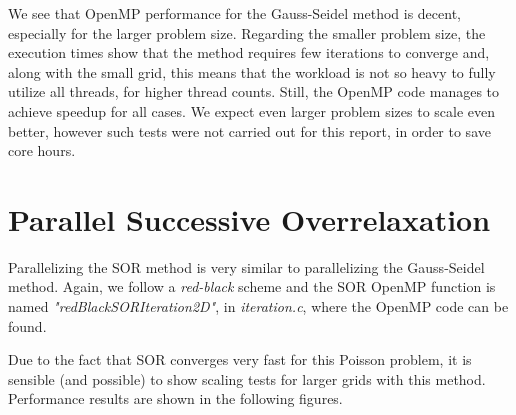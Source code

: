 \documentclass[11pt]{report}
\begin{document}
\newpage

We see that OpenMP performance for the Gauss-Seidel method is decent, especially for the larger problem size. Regarding the smaller problem size, the execution times show that the method requires few iterations to converge and, along with the small grid, this means that the workload is not so heavy to fully utilize all threads, for higher thread counts. Still, the OpenMP code manages to achieve speedup for all cases. We expect even larger problem sizes to scale even better, however such tests were not carried out for this report, in order to save core hours.

\section{Parallel Successive Overrelaxation}
Parallelizing the SOR method is very similar to parallelizing the Gauss-Seidel method. Again, we follow a \emph{red-black} scheme and the SOR OpenMP function is named \emph{"redBlackSORIteration2D"}, in \emph{iteration.c}, where the OpenMP code can be found. 
\newline

Due to the fact that SOR converges very fast for this Poisson problem, it is sensible (and possible) to show scaling tests for larger grids with this method. Performance results are shown in the following figures.
\end{document}

